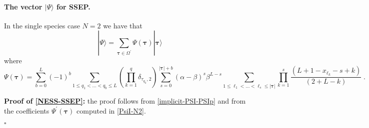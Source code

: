 \documentclass[10pt]{article}
\numberwithin{equation}{section}
\numberwithin{equation}{subsection}
\newcommand{\dt}{\;.}
\begin{document}
\paragraph{The vector $|\Psi\rangle$ for SSEP.}
In the single species case {$N=2$} we have that  
\begin{equation}\label{NESS-SSEP}
	|\Psi\rangle=\sum_{\bm{\tau}\in \Omega^{'}}\Psi(\bm{\tau})|\bm{\tau}\rangle
\end{equation}
where
\begin{equation}
	\Psi(\bm{\tau})=\sum_{b=0}^{L}(-1)^{b}\sum_{1\leq q_{1}<\ldots<q_{b}\leq L}\left(\prod_{k=1}^{q}\delta_{\tau_{q_{k}},2}\right)\sum_{s=0}^{|\bm{\tau}|+b}(\alpha-\beta)^{s}\beta^{L-s}\sum_{1\leq \ell_{1}<\ldots<\ell_{s}\leq |\bm{\tau}|}\prod_{k=1}^{s}\frac{\left(L+1-x_{\ell_{k}}-s+k\right)}{(2+L-k)}\dt
\end{equation}

\textbf{Proof of \eqref{NESS-SSEP}:} the proof follows from \eqref{implicit-PSI-PSIp} and from the coefficients $\Psi^{'}(\bm{\tau})$ computed in \eqref{PsiI-N2}. 
\begin{flushright}
	$\square$
\end{flushright}
\end{document}

